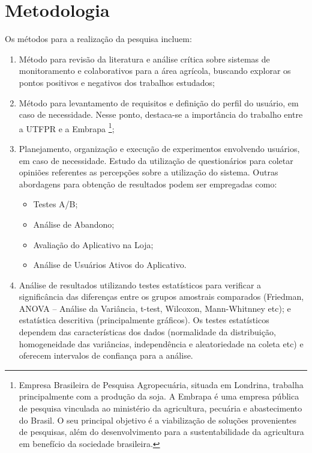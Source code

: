 \documentclass[12pt]{article}
\begin{document}
\section{Metodologia}
\label{sec:metodologia}

Os métodos para a realização da pesquisa incluem:

\begin{enumerate}
	\item Método para revisão da literatura e análise crítica sobre sistemas de monitoramento e colaborativos para a área agrícola, buscando explorar os pontos positivos e negativos dos trabalhos estudados;
	\item Método para levantamento de requisitos e definição do perfil do usuário, em caso de necessidade. Nesse ponto, destaca-se a importância do trabalho entre a UTFPR e a Embrapa \footnote{Empresa Brasileira de Pesquisa Agropecuária, situada em Londrina, trabalha principalmente com a produção da soja. A Embrapa é uma empresa pública de pesquisa vinculada ao ministério da agricultura, pecuária e abastecimento do Brasil. O seu principal objetivo é a viabilização de soluções provenientes de pesquisas, além do desenvolvimento para a sustentabilidade da agricultura em benefício da sociedade brasileira.};
	\item Planejamento, organização e execução de experimentos envolvendo usuários, em caso de necessidade. Estudo da utilização de questionários para coletar opiniões referentes as percepções sobre a utilização do sistema. Outras abordagens para obtenção de resultados podem ser empregadas como:
	\begin{itemize}
		\item Testes A/B;
		\item Análise de Abandono;
		\item Avaliação do Aplicativo na Loja;
		\item Análise de Usuários Ativos do Aplicativo.
	\end{itemize}
	\item Análise de resultados utilizando testes estatísticos para verificar a significância das diferenças entre os grupos amostrais comparados (Friedman, ANOVA – Análise da Variância, t-test, Wilcoxon, Mann-Whitnney etc); e estatística descritiva (principalmente gráficos). Os testes estatísticos dependem das características dos dados (normalidade da distribuição, homogeneidade das variâncias, independência e aleatoriedade na coleta etc) e oferecem intervalos de confiança para a análise.
\end{enumerate}
\end{document}
